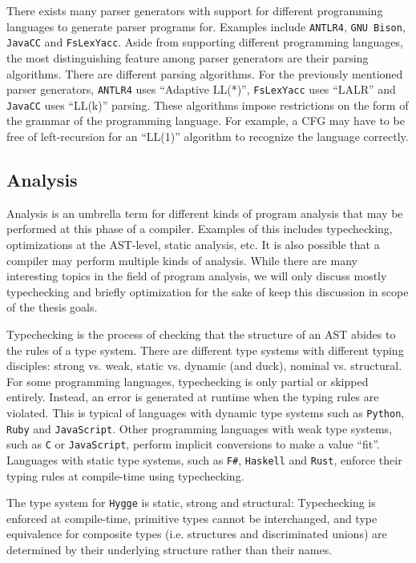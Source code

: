 There exists many parser generators with support for different programming languages to generate parser programs for. Examples include \texttt{ANTLR4}, \texttt{GNU Bison},
\texttt{JavaCC} and \texttt{FsLexYacc}. Aside from supporting different programming languages, the most distinguishing feature among parser generators are their parsing algorithms.
There are different parsing algorithms. For the previously mentioned parser generators, \texttt{ANTLR4} uses ``Adaptive LL(*)'', \texttt{FsLexYacc} uses ``LALR'' and \texttt{JavaCC}
uses ``LL(k)'' parsing. These algorithms impose restrictions on the form of the grammar of the programming language. For example, a CFG may have to be free of left-recursion for an ``LL(1)'' algorithm to recognize the language correctly.

\subsection{Analysis}

Analysis is an umbrella term for different kinds of program analysis that may be performed at this phase of a compiler. Examples of this includes typechecking, optimizations at the AST-level,
static analysis, etc. It is also possible that a compiler may perform multiple kinds of analysis. While there are many interesting topics in the field of program analysis,
we will only discuss mostly typechecking and briefly optimization for the sake of keep this discussion in scope of the thesis goals.

Typechecking is the process of checking that the structure of an AST abides to the rules of a type system. There are different type systems with different typing disciples:
strong vs. weak, static vs. dynamic (and duck), nominal vs. structural. For some programming languages, typechecking is only partial or skipped entirely. Instead,
an error is generated at runtime when the typing rules are violated. This is typical of languages with dynamic type systems such as \texttt{Python}, \texttt{Ruby} and
\texttt{JavaScript}. Other programming languages with weak type systems, such as \texttt{C} or \texttt{JavaScript}, perform implicit conversions to make a value ``fit''.
Languages with static type systems, such as \texttt{F\#}, \texttt{Haskell} and \texttt{Rust}, enforce their typing rules at compile-time using typechecking.

The type system for \texttt{Hygge} is static, strong and structural: Typechecking is enforced at compile-time, primitive types cannot be interchanged, and type
equivalence for composite types (i.e. structures and discriminated unions) are determined by their underlying structure rather than their names. 

